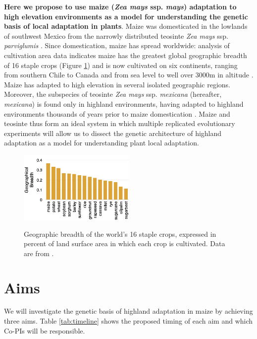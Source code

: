 {\bf Here we propose to use maize (\emph{Zea mays} ssp. \emph{mays}) adaptation to high elevation environments as a model for understanding the genetic basis of local adaptation in plants}.  Maize was domesticated in the lowlands of southwest Mexico from the narrowly distributed teosinte \emph{Zea mays} ssp. \emph{parviglumis} \citep[hereafter, \emph{parviglumis};][]{Matsuoka2002}. Since domestication, maize has spread worldwide: analysis of cultivation area data indicates maize has the greatest global geographic breadth of 16 staple crops (Figure \ref{fig:breadth}) and is now cultivated on six continents, ranging from southern Chile to Canada and from sea level to well over 3000m in altitude \citep{tenaillon2011european}. Maize has adapted to high elevation in several isolated geographic regions.  Moreover, the subspecies of teosinte \emph{Zea mays} ssp. \emph{mexicana} (hereafter, \emph{mexicana}) is found only in highland environments, having adapted to highland environments thousands of years prior to maize domestication \citep{Ross-Ibarra2009a, hufford2012inferences}. Maize and teosinte thus form an ideal system in which multiple replicated evolutionary experiments will allow us to dissect the genetic architecture of highland adaptation as a model for understanding plant local adaptation.

\begin{figure}
  \centering
  \caption{Geographic breadth of the world's 16 staple crops, expressed in percent of land surface area in which each crop is cultivated. Data are from \citet{monfreda2008farming}. } 
   \includegraphics[width=0.5\textwidth]{breadth.png}
\label{fig:breadth}
\end{figure}

\section*{Aims}

We will investigate the genetic basis of highland adaptation in maize by achieving three aims. Table \ref{tab:timeline} shows the proposed timing of each aim and which Co-PIs will be responsible.

